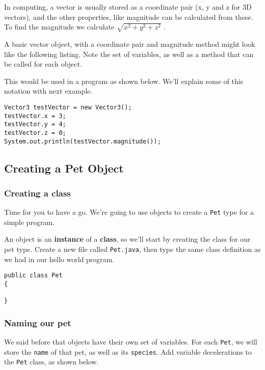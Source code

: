 		In computing, a vector is usually stored as a coordinate pair (x, y and z for 3D vectors), and the other properties, like magnitude can be calculated from these. To find the magnitude we calculate $\sqrt{x^2 + y^2 + z^2}$ .
		
		A basic vector object, with a coordinate pair and magnitude method might look like the following listing. Note the set of variables, as well as a method that can be called for each object.		
		
		
		
		This would be used in a program as shown below. We'll explain some of this notation with next example.
		
		\begin{lstlisting}[style=Java, numbers=none]
Vector3 testVector = new Vector3();
testVector.x = 3;
testVector.y = 4;
testVector.z = 0;
System.out.println(testVector.magnitude());
		\end{lstlisting}
	
	
	\subsection{Creating a Pet Object}

		\subsubsection{Creating a class}
		
			Time for you to have a go. We're going to use objects to create a \texttt{Pet} type for a simple program.
			
			An object is an \textbf{instance} of a \textbf{class}, so we'll start by creating the class for our pet type.
			Create a new file called \texttt{Pet.java}, then type the same class definition as we had in our hello world program.
			
			\begin{lstlisting}[style=Java]
public class Pet
{

}
			\end{lstlisting}
		
		\subsubsection{Naming our pet}
		
			We said before that objects have their own set of variables. For each \texttt{Pet}, we will store the \texttt{name} of that pet, as well as its \texttt{species}. Add variable decelerations to the \texttt{Pet} class, as shown below.
			
